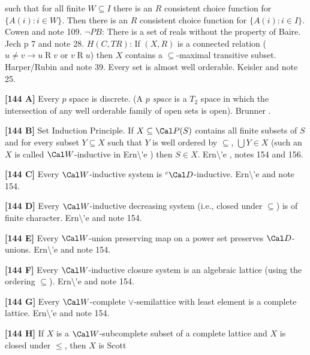 such that for all finite $W\subseteq I$ there is an $R$ consistent choice
function for $\{A(i): i \in W\}$. Then there is an $R$ consistent choice
function for $\{A(i): i\in I\}$. \ac{Cowen} \cite{1977b} and note 109.
\medskip
{} $\neg  PB$:  There is a set of reals without the
property of Baire.  \ac{Jech} \cite{1973b} p 7 and note 28.
\medskip
{} $H(C,TR)$: If $(X,R)$ is a connected relation
($u\neq v\rightarrow u\mathrel R v$ or $v\mathrel R u$) then $X$ contains
a $\subseteq$-maximal transitive subset.  \ac{Harper/Rubin} \cite{1976}
and note 39.
\medskip
{} Every set is almost well orderable. \ac{Keisler}
\cite{1970} and note 25.
\smallskip
\item{}{\bf [144 A]}  Every $p$ space is discrete. (A $p$ {\it space} is a
$T_2$ space in which the intersection of any well orderable family
of open sets is open).  \ac{Brunner} \cite{1984c}.
\smallskip
\item{}{\bf [144 B]} Set Induction Principle.  If $X
\subseteq \Cal P(S)$ contains all finite subsets of $S$ and for
every subset $Y\subseteq X$ such that $Y$ is well ordered
by $\subseteq$, $\bigcup Y\in X$
(such an $X$ is called $\Cal W$-inductive in \ac{Ern\'e} \cite{2000})
then $S\in X$. \ac{Ern\'e} \cite{2000}, notes 154 and 156.
\smallskip
\item{}{\bf [144 C]} Every $\Cal W$-inductive system is $^c\Cal
D$-inductive.  \ac{Ern\'e} \cite{2000} and note 154.
\smallskip
\item{}{\bf [144 D]} Every $\Cal W$-inductive decreasing system
(i.e., closed under $\subseteq$) is of finite character.
\ac{Ern\'e} \cite{2000} and note 154.  
\smallskip
\item{}{\bf [144 E]} Every $\Cal W$-union preserving map on a
power set preserves $\Cal D$-unions. \ac{Ern\'e} \cite{2000} and note
154.
\smallskip
\item{}{\bf [144 F]} Every $\Cal W$-inductive closure system is
an algebraic lattice (using the ordering $\subseteq$).
\ac{Ern\'e} \cite{2000} and note 154. 
 
\smallskip
\item{}{\bf [144 G]} Every $\Cal W$-complete $\lor$-semilattice
with least element is a complete lattice.  \ac{Ern\'e} \cite{2000} and
note 154.  
\smallskip
\item{}{\bf [144 H]} If $X$ is a $\Cal W$-subcomplete subset of a
complete lattice and $X$ is closed under $\le$, then $X$ is Scott
